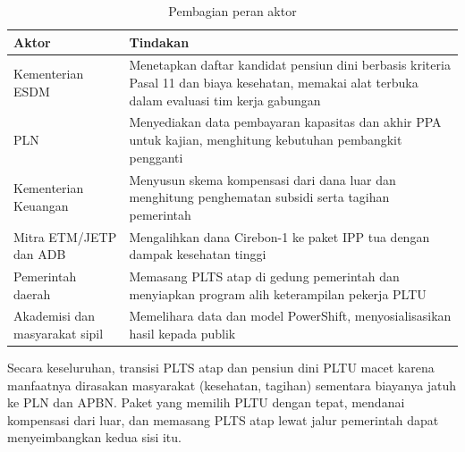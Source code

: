 \begin{table}[H]
\centering
\caption{Pembagian peran aktor}
\label{tab:aktor}
\small
\begin{tabularx}{\textwidth}{p{} X}
\toprule
Aktor & Tindakan \\
\midrule
Kementerian ESDM & Menetapkan daftar kandidat pensiun dini berbasis kriteria Pasal 11 dan biaya kesehatan, memakai alat terbuka dalam evaluasi tim kerja gabungan \\
PLN & Menyediakan data pembayaran kapasitas dan akhir PPA untuk kajian, menghitung kebutuhan pembangkit pengganti \\
Kementerian Keuangan & Menyusun skema kompensasi dari dana luar dan menghitung penghematan subsidi serta tagihan pemerintah \\
Mitra ETM/JETP dan ADB & Mengalihkan dana Cirebon-1 ke paket IPP tua dengan dampak kesehatan tinggi \\
Pemerintah daerah & Memasang PLTS atap di gedung pemerintah dan menyiapkan program alih keterampilan pekerja PLTU \\
Akademisi dan masyarakat sipil & Memelihara data dan model PowerShift, menyosialisasikan hasil kepada publik \\
\bottomrule
\end{tabularx}
\end{table}

Secara keseluruhan, transisi PLTS atap dan pensiun dini PLTU macet karena manfaatnya dirasakan masyarakat (kesehatan, tagihan) sementara biayanya jatuh ke PLN dan APBN. Paket yang memilih PLTU dengan tepat, mendanai kompensasi dari luar, dan memasang PLTS atap lewat jalur pemerintah dapat menyeimbangkan kedua sisi itu.
